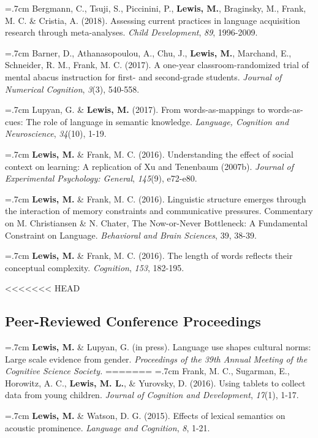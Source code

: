 \documentclass[letterpaper]{article}
\begin{document}
\hangindent=.7cm Bergmann, C., Tsuji, S., Piccinini, P., {\bf Lewis, M.}, Braginsky, M., Frank, M. C. \& Cristia, A. (2018). Assessing current practices in language acquisition research through meta-analyses. {\it Child Development},  {\it 89}, 1996-2009.

\hangindent=.7cm Barner, D., Athanasopoulou, A., Chu, J., {\bf Lewis, M.}, Marchand, E., Schneider, R. M., Frank, M. C. (2017). A one-year classroom-randomized trial of mental abacus instruction for first- and second-grade students.  {\it Journal of Numerical Cognition}, {\it  3}(3), 540-558.

\hangindent=.7cm Lupyan, G. \& {\bf Lewis, M.} (2017). From words-as-mappings to words-as-cues: The role of language in semantic knowledge. {\it Language, Cognition and Neuroscience}, {\it 34}(10), 1-19.

  \hangindent=.7cm {\bf Lewis, M.} \& Frank, M. C. (2016). Understanding the effect of social context on learning: A replication of Xu and Tenenbaum (2007b). {\it Journal of Experimental Psychology: General}, {\it 145}(9), e72-e80.

 \hangindent=.7cm {\bf Lewis, M.} \& Frank, M. C. (2016). Linguistic structure emerges through the interaction of memory constraints and communicative pressures. Commentary on M. Christiansen \& N. Chater, The Now-or-Never Bottleneck: A Fundamental Constraint on Language. {\it Behavioral and Brain Sciences}, 39, 38-39.

  \hangindent=.7cm {\bf Lewis, M.} \& Frank, M. C. (2016). The length of words reflects their conceptual complexity. {\it Cognition}, {\it 153}, 182-195.

<<<<<<< HEAD
  \subsection*{Peer-Reviewed Conference Proceedings} 
    \hangindent=.7cm {\bf Lewis, M.} \& Lupyan, G. (in press). Language use shapes cultural norms: Large scale evidence from gender.  { \it Proceedings of the 39th Annual Meeting of the Cognitive Science Society.}
=======
 \hangindent=.7cm Frank, M. C., Sugarman, E., Horowitz, A. C., {\bf Lewis, M. L.}, \& Yurovsky, D. (2016). Using tablets to collect data from young children. {\it Journal of Cognition and Development}, {\it 17}(1), 1-17.

  \hangindent=.7cm {\bf Lewis, M.} \& Watson, D. G. (2015). Effects of lexical semantics on acoustic prominence. { \it Language and Cognition}, {\it 8}, 1-21.
  
\end{document}
